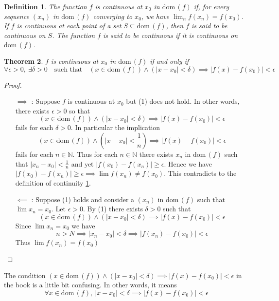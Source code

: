 \documentclass[12pt, lettersize]{book}
\newtheorem{thm}{Theorem}[section]
\newtheorem{dfn}[thm]{Definition}
\newcommand{\N}{\mathbb{N}}
\newcommand{\dom}{\text{dom}\,}
\begin{document}
			\begin{dfn}\label{def:continuous}
			The function $f$ is \emph{continuous} at $x_0$ in $\dom(f)$ if, for every sequence $(x_n)$ in $\dom(f)$ converging to $x_0$, we have $\lim_nf(x_n)=f(x_0)$. If $f$ is continuous at each point of a set $S\subseteq\dom(f)$, then $f$ is said to be \emph{continuous} on $S$. The function $f$ is said to be
			\emph{continuous} if it is continuous on $\dom(f)$.
			\end{dfn}
		
			\setcounter{equation}{0}
			\begin{thm}\label{def:delta-epsilon property}
				$f$ is continuous at $x_0$ in $\dom(f)$ if and only if
				\begin{equation}
					\forall\epsilon>0,\ \exists\delta>0\quad\text{such that}\quad(x\in\dom(f))\land(|x-x_0|<\delta)\implies|f(x)-f(x_0)|<\epsilon
				\end{equation}
			\end{thm}
			\begin{proof}
			\begin{itemize}
				\item[]
				\item[$\implies$]: Suppose $f$ is continuous at $x_0$ but (1) does not hold. In other words, there exists
				$\epsilon>0$ so that
				\begin{displaymath}
					(x\in\dom(f))\land(|x-x_0|<\delta)\implies|f(x)-f(x_0)|<\epsilon
				\end{displaymath}
				fails for each $\delta>0$. In particular the implication
				\begin{displaymath}
					(x\in\dom(f))\land(|x-x_0|<\frac{1}{n})\implies|f(x)-f(x_0)|<\epsilon
				\end{displaymath}
				fails for each $n\in\N$. Thus for each $n\in\N$ there exists $x_n$ in $\dom(f)$ such that $|x_n-x_0|<\frac{1}{n}$ and yet $|f(x_0)-f(x_n)|\geq\epsilon$. Hence we have $|f(x_0)-f(x_n)|\geq\epsilon\implies\lim f(x_n)\neq f(x_0)$. This contradicts to the definition of continuity \ref{def:continuous}.								
				\item[$\impliedby$]: Suppose (1) holds and consider a $(x_n)$ in $\dom(f)$ such that $\lim x_n=x_0$. Let
				$\epsilon>0$. By (1) there exists $\delta>0$ such that
				\begin{displaymath}
					(x\in\dom(f))\land(|x-x_0|<\delta)\implies|f(x)-f(x_0)|<\epsilon
				\end{displaymath}
				Since $\lim x_n=x_0$ we have
				\begin{displaymath}
					n>N\implies|x_n-x_0|<\delta\implies|f(x_n)-f(x_0)|<\epsilon
				\end{displaymath}
				Thus $\lim f(x_n)=f(x_0)$
			\end{itemize}
			\end{proof}
			The condition $(x\in\dom(f))\land(|x-x_0|<\delta)\implies|f(x)-f(x_0)|<\epsilon$ in the book is a little bit
			confusing. In other words, it means
			\begin{displaymath}
				\forall x\in\dom(f),\ |x-x_0|<\delta\implies|f(x)-f(x_0)|<\epsilon
			\end{displaymath}
			
\end{document}
